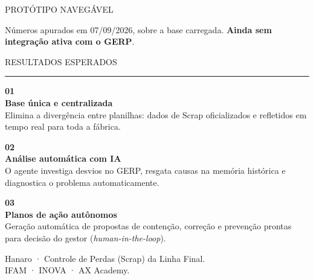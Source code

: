 \documentclass[rodape]{hanarokickoff}
\newcommand{\ddcontrib}[3]{%
  \begin{minipage}[t]{8.5cm}\vspace{0pt}\RaggedRight\hyphenpenalty=10000
    {\dximont\bfseries\fontsize{26}{30}\selectfont\color{dxicinza}#1}\\[0.10em]
    {\dximont\bfseries\fontsize{15}{19}\selectfont\color{lgred}#2}\\[0.30em]
    {\dxiurb\fontsize{12.5}{17}\selectfont\color{dxinavy!85}#3}%
  \end{minipage}\hspace{0.9cm}\ignorespaces}
\begin{document}
\begin{dxiconteudo}[semdeco]{PROTÓTIPO NAVEGÁVEL}
{  \vspace{0.35em}
  {\dxiurb\fontsize{11}{14}\selectfont\color{dxinavy!70}
   Números apurados em 07/09/2026, sobre a base carregada. \textbf{Ainda sem
   integração ativa com o GERP}.\par}
}

\end{dxiconteudo}


\begin{dxiconteudo}{RESULTADOS ESPERADOS}

\vspace{-0.15cm}

%

\vspace{1.2em}
{\color{dxicinza}\rule{27.4cm}{0.6pt}}
\vspace{1.2em}

\ddcontrib{01}{Base única e centralizada}{%
  Elimina a divergência entre planilhas: dados de Scrap oficializados e
  refletidos em tempo real para toda a fábrica.}%
\ddcontrib{02}{Análise automática com IA}{%
  O agente investiga desvios no GERP, resgata causas na memória histórica
  e diagnostica o problema automaticamente.}%
\ddcontrib{03}{Planos de ação autônomos}{%
  Geração automática de propostas de contenção, correção e prevenção
  prontas para decisão do gestor (\textit{human-in-the-loop}).}

\end{dxiconteudo}


  {Hanaro · Controle de Perdas (Scrap) da Linha Final.\\
   IFAM · INOVA · AX Academy.}
\end{document}
